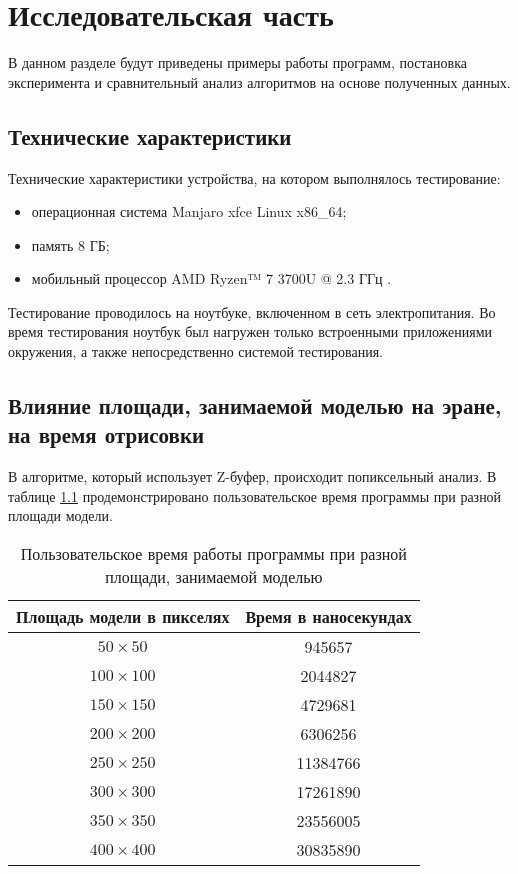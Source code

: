 \chapter{Исследовательская часть}

В данном разделе будут приведены примеры работы программ, постановка эксперимента и сравнительный анализ алгоритмов на основе полученных данных.

\section{Технические характеристики}

Технические характеристики устройства, на котором выполнялось тестирование:

\begin{itemize}
	\item операционная система Manjaro xfce \cite{ubuntu} Linux \cite{linux} x86\_64;
	\item память 8 ГБ;
	\item мобильный процессор AMD Ryzen™ 7 3700U @ 2.3 ГГц \cite{intel}.
\end{itemize}

Тестирование проводилось на ноутбуке, включенном в сеть электропитания. Во время тестирования ноутбук был нагружен только встроенными приложениями окружения, а также непосредственно системой тестирования.

\section{Влияние площади, занимаемой моделью на эране, на время отрисовки}

В алгоритме, который использует Z-буфер, происходит попиксельный анализ. В таблице \ref{tab:time1} продемонстрировано пользовательское время программы при разной площади модели.

\begin{table}[ht!]
	\begin{center}
		\caption{Пользовательское время работы программы при разной площади, занимаемой моделью}
		\label{tab:time1}
		\begin{tabular}{|c|c|}
			\hline
			Площадь модели в пикселях & Время в наносекундах \\
			\hline
			$50 \times 50$  &  945657 \\
			\hline
			$100 \times 100$  & 2044827 \\
			\hline
			$150 \times 150$  & 4729681 \\
			\hline
			$200 \times 200$ & 6306256 \\
			\hline
			$250 \times 250$ & 11384766 \\
			\hline
			$300 \times 300$ & 17261890 \\
			\hline
			$350 \times 350$ & 23556005 \\
			\hline
			$400 \times 400$ & 30835890 \\
			\hline
		\end{tabular}
	\end{center}
\end{table}

